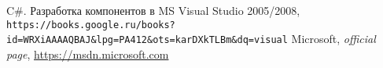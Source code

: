 \begin{thebibliography}{99999}
{}
\singlespace\normalsize

 C\#. Разработка компонентов в MS Visual Studio 2005/2008,  \texttt{https://books.google.ru/books?id=WRXiAAAAQBAJ\&lpg=PA412\&ots=karDXkTLBm\&dq=visual}
\hfill
{} Microsoft, \textit{ official page}, \url{https://msdn.microsoft.com}


\end{thebibliography}
